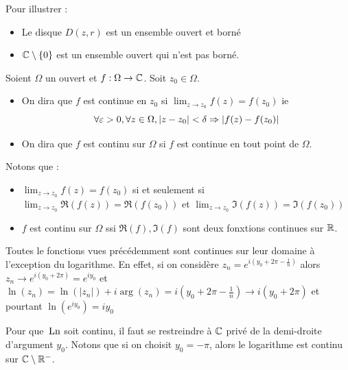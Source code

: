\begin{exemple}
    Pour illustrer :
    \begin{itemize}
        \item Le disque $D(z,r)$ est un ensemble ouvert et borné 
        \item $\mathbb{C}\setminus \{0\}$ est un ensemble ouvert qui n'est pas borné.
    \end{itemize}
\end{exemple}
\begin{definition}
    Soient $\Omega$ un ouvert et $f:\Omega \to \mathbb{C}$. Soit $z_0\in\Omega$. \begin{itemize}
        \item On dira que $f$ est continue en $z_0$ si $\lim_{z\to z_0}f(z) = f(z_0)$ ie $$\forall \varepsilon>0,\forall z \in \Omega, \left| z-z_0 \right|<\delta\Rightarrow \left| f(z)-f(z_0) \right|$$
        \item On dira que $f$ est continu sur $\Omega$ si $f$ est continue en tout point de $\Omega$.
    \end{itemize}
\end{definition}
\begin{remarque}
Notons que :
    \begin{itemize}
        \item $\lim_{z\to z_0}f(z) = f(z_0)$ si et seulement si $\lim_{z\to z_0}\Re(f(z)) = \Re(f(z_0))$ et $\lim_{z\to z_0}\Im(f(z)) = \Im(f(z_0))$
        \item $f$ est continu sur $\Omega$ ssi $\Re(f), \Im(f)$ sont deux fonxtions continues sur $\mathbb{R}$.
    \end{itemize}
\end{remarque}
\begin{exemple}
    Toutes le fonctions vues précédemment sont continues sur leur domaine à l'exception du logarithme. En effet, si on considère $z_n = e^{i(y_0+2\pi - \frac{1}{n})}$ alors $z_n \to e^{i(y_0+2\pi)}= e^{iy_0}$ et $\ln(z_n)= \ln (|z_n|)+ i \operatorname{arg}(z_n)= i(y_0+2\pi - \frac{1}{n})\to i(y_0+2\pi)$ et pourtant $\ln(e^{iy_0})= iy_0$
\end{exemple}
Pour que ${\,\operatorname{Ln}}$ soit continu, il faut se restreindre à $\mathbb{C}$ privé de la demi-droite d'argument $y_0$. Notons que si on choisit $y_0= -\pi $, alors le logarithme est continu sur $\mathbb{C} \setminus \mathbb{R} ^-$.